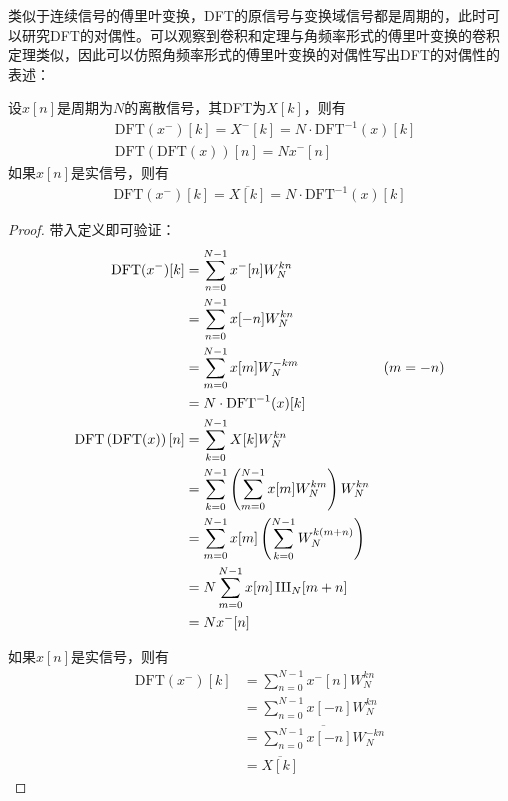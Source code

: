 类似于连续信号的傅里叶变换，DFT的原信号与变换域信号都是周期的，此时可以研究DFT的对偶性。可以观察到卷积和定理与角频率形式的傅里叶变换的卷积定理类似，因此可以仿照角频率形式的傅里叶变换的对偶性写出DFT的对偶性的表述：
\begin{proposition}[离散傅里叶变换的对偶性]\label{prop:DFT_dual}
    设$x[n]$是周期为$N$的离散信号，其DFT为$X[k]$，则有
    \begin{align*}
        &\mathrm{DFT}(x^-)[k]=X^-[k]=N\cdot\mathrm{DFT}^{-1}(x)[k]\\
        &\mathrm{DFT}\left(\mathrm{DFT}(x)\right)[n]=N x^- [n]
    \end{align*}
    如果$x[n]$是实信号，则有
    \begin{align*}
        \mathrm{DFT}(x^-)[k]=\overline{X[k]}=N\cdot\mathrm{DFT}^{-1}(x)[k]
    \end{align*}
\end{proposition}
\begin{proof}
    带入定义即可验证：
    \begin{align*}
        \mathrm{DFT}(x^-)[k]&=\sum_{n=0}^{N-1}x^- [n]W_N^{kn}\\
        &=\sum_{n=0}^{N-1}x[-n]W_N^{kn}\\
        &=\sum_{m=0}^{N-1}x[m]W_N^{-km}&(m=-n)\\
        &=N\cdot\mathrm{DFT}^{-1}(x)[k]\\
        \mathrm{DFT}\left(\mathrm{DFT}(x)\right)[n]&=\sum_{k=0}^{N-1}X[k]W_N^{kn}\\
        &=\sum_{k=0}^{N-1}\left(\sum_{m=0}^{N-1}x[m]W_N^{km}\right)W_N^{kn}\\
        &=\sum_{m=0}^{N-1}x[m]\left(\sum_{k=0}^{N-1}W_N^{k(m+n)}\right)\\
        &=N\sum_{m=0}^{N-1}x[m]\operatorname{III}_N[m+n]\\
        &=N x^- [n]
    \end{align*}

    如果$x[n]$是实信号，则有
    \begin{align*}
        \mathrm{DFT}(x^-)[k]&=\sum_{n=0}^{N-1}x^- [n]W_N^{kn}\\
        &=\sum_{n=0}^{N-1}x[-n]W_N^{kn}\\
        &=\overline{\sum_{n=0}^{N-1}x[-n]W_N^{-kn}}\\
        &=\overline{X[k]}
    \end{align*}
\end{proof}


